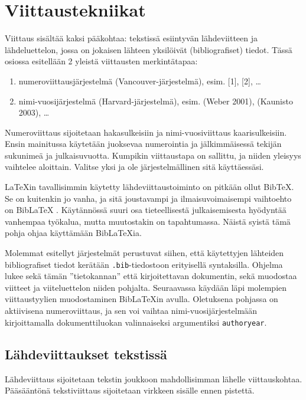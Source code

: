 \chapter{Viittaustekniikat}
\label{ch:viittaustekniikat}

Viittaus sisältää kaksi pääkohtaa: tekstissä esiintyvän lähdeviitteen ja lähdeluettelon, jossa on jokaisen lähteen yksilöivät (bibliografiset) tiedot. Tässä osiossa esitellään 2 yleistä viittausten merkintätapaa:
\begin{enumerate}
    \item numeroviittausjärjestelmä (Vancouver-järjestelmä), esim. [1], [2], \ldots
    \item nimi-vuosijärjestelmä (Harvard-järjestelmä), esim. (Weber 2001), (Kaunisto 2003), \ldots
\end{enumerate}
Numeroviittaus sijoitetaan hakasulkeisiin ja nimi-vuosiviittaus kaarisulkeisiin. Ensin mainitussa käytetään juoksevaa numerointia ja jälkimmäisessä tekijän sukunimeä ja julkaisuvuotta. Kumpikin viittaustapa on sallittu, ja niiden yleisyys vaihtelee aloittain. Valitse yksi ja ole järjestelmällinen sitä käyttäessäsi.

\LaTeX{}in tavallisimmin käytetty lähdeviittaustoiminto on pitkään ollut Bib\TeX. Se on kuitenkin jo vanha, ja sitä joustavampi ja ilmaisuvoimaisempi vaihtoehto on Bib\LaTeX{} \parencite{biblatex}. Käytännössä suuri osa tieteellisestä julkaisemisesta hyödyntää vanhempaa työkalua, mutta muutostakin on tapahtumassa. Näistä syistä tämä pohja ohjaa käyttämään Bib\LaTeX{}ia.

Molemmat esitellyt järjestelmät perustuvat siihen, että käytettyjen lähteiden bibliografiset tiedot kerätään \texttt{.bib}-tiedostoon erityisellä syntaksilla. Ohjelma lukee sekä tämän ''tietokannan'' että kirjoitettavan dokumentin, sekä muodostaa viitteet ja viiteluettelon niiden pohjalta. Seuraavassa käydään läpi molempien viittaustyylien muodostaminen Bib\LaTeX{}in avulla. Oletuksena pohjassa on aktiivisena numeroviittaus, ja sen voi vaihtaa nimi-vuosi\-järjestelmään kirjoittamalla dokumenttiluokan valinnaiseksi argumentiksi \texttt{authoryear}.

\section{Lähdeviittaukset tekstissä}

Lähdeviittaus sijoitetaan tekstin joukkoon mahdollisimman lähelle viittauskohtaa. Pääsääntönä tekstiviittaus sijoitetaan virkkeen sisälle ennen pistettä.

